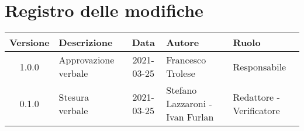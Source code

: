 \section*{Registro delle modifiche}

\begin{center}
	\begin{longtable}{|c|p{4cm}|c|p{3cm}|p{3cm}|}
		\hline
		\rowcolor{lighter-grayer}
		\textbf{Versione} & \textbf{Descrizione} & \textbf{Data} & \textbf{Autore} & \textbf{Ruolo} \\
		\hline
		\endfirsthead


		\hline
		1.0.0 & Approvazione verbale & 2021-03-25 & Francesco Trolese & Responsabile \\
		0.1.0 & Stesura verbale & 2021-03-25 & Stefano Lazzaroni - Ivan Furlan & Redattore - Verificatore \\
		\hline
	\end{longtable}
\end{center}